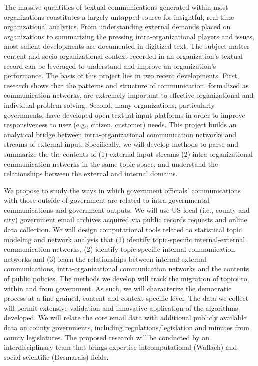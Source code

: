 

 \vspace{.1cm}

\noindent The massive quantities of textual communications generated within most organizations constitutes a largely untapped source for insightful, real-time organizational analytics. From understanding external demands placed on organizations to summarizing the pressing intra-organizational players and issues, most salient developments are documented in digitized text. The subject-matter content and socio-organizational context recorded in an organization's textual record can be leveraged to understand and improve an organization's performance. The basis of this project lies in two recent developments. First, research shows that the patterns and structure of communication, formalized as communication networks, are extremely important to effective organizational and individual problem-solving.  Second, many organizations, particularly governments, have developed open textual input platforms in order to improve responsiveness to user (e.g., citizen, customer) needs. This project builds an analytical bridge between intra-organizational communication networks and streams of external input. Specifically, we will develop methods to parse and summarize the the contents of (1) external input streams  (2) intra-organizational communication networks in the same topic-space, and understand the relationships between the external and internal domains.   \vspace{.05cm}


 We propose to study the ways in which government officials' communications with those outside of government are related to intra-governmental communications and government outputs. We will use US local (i.e., county and city) government email archives acquired via public records requests and online data collection. We will design computational tools related to statistical topic modeling and network analysis that (1) identify topic-specific internal-external communication networks, (2) identify topic-specific internal communication networks and (3) learn the relationships between internal-external communications, intra-organizational communication networks and the contents of public policies.  The methods we develop will track the migration of topics to, within and from government. As such, we will characterize the democratic process at a fine-grained, content and context specific level.  The data we collect will permit extensive validation and innovative application of the algorithms developed. We will relate the core email data with additional publicly available data on county governments, including regulations/legislation and minutes from county legislatures. The proposed research will be conducted by an interdisciplinary team that brings expertise intcomputational (Wallach) and social scientific (Desmarais) fields. \vspace{.25cm}


